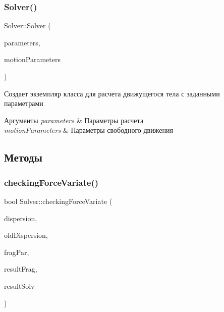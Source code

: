 \subsubsection{\texorpdfstring{Solver()}{Solver()}\hspace{0.1cm}{\footnotesize\ttfamily [3/3]}}
{\footnotesize\ttfamily Solver\+::\+Solver (\begin{DoxyParamCaption}\item[{const \mbox{\hyperlink{struct_solver_parameters}{Solver\+Parameters}} \&}]{parameters,  }\item[{const \mbox{\hyperlink{struct_free_motion_parameters}{Free\+Motion\+Parameters}} \&}]{motion\+Parameters }\end{DoxyParamCaption})}

Создает экземпляр класса для расчета движущегося тела с заданными параметрами 
\begin{DoxyParams}{Аргументы}
{\em parameters} & Параметры расчета \\
\hline
{\em motion\+Parameters} & Параметры свободного движения \\
\hline
\end{DoxyParams}


\subsection{Методы}
\mbox{\label{class_solver_ac248de801df706a545e4d72a7bf1b9e0}} 
\subsubsection{\texorpdfstring{checking\+Force\+Variate()}{checkingForceVariate()}}
{\footnotesize\ttfamily bool Solver\+::checking\+Force\+Variate (\begin{DoxyParamCaption}\item[{double \&}]{dispersion,  }\item[{double \&}]{old\+Dispersion,  }\item[{\mbox{\hyperlink{struct_fragmentation_parameters}{Fragmentation\+Parameters}} \&}]{frag\+Par,  }\item[{\mbox{\hyperlink{struct_fragmentation_parameters}{Fragmentation\+Parameters}} \&}]{result\+Frag,  }\item[{\mbox{\hyperlink{struct_solver_parameters}{Solver\+Parameters}} \&}]{result\+Solv }\end{DoxyParamCaption})}

